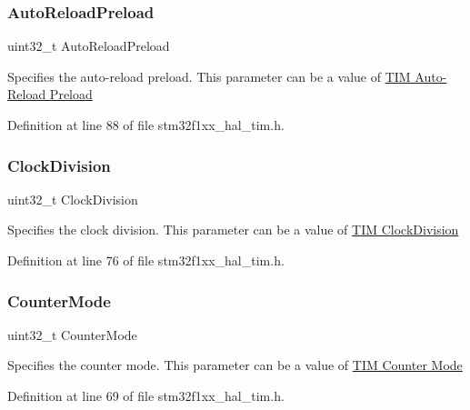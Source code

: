 \subsubsection{\texorpdfstring{Auto\+Reload\+Preload}{AutoReloadPreload}}
{\footnotesize\ttfamily uint32\+\_\+t Auto\+Reload\+Preload}

Specifies the auto-\/reload preload. This parameter can be a value of \hyperlink{group___t_i_m___auto_reload_preload}{T\+IM Auto-\/\+Reload Preload} 

Definition at line 88 of file stm32f1xx\+\_\+hal\+\_\+tim.\+h.

\mbox{\label{struct_t_i_m___base___init_type_def_a8f20e02ae2774e1523942604315b8e13}} 
\subsubsection{\texorpdfstring{Clock\+Division}{ClockDivision}}
{\footnotesize\ttfamily uint32\+\_\+t Clock\+Division}

Specifies the clock division. This parameter can be a value of \hyperlink{group___t_i_m___clock_division}{T\+IM Clock\+Division} 

Definition at line 76 of file stm32f1xx\+\_\+hal\+\_\+tim.\+h.

\mbox{\label{struct_t_i_m___base___init_type_def_a4b29303489c983d0e9326d7ae0196ceb}} 
\subsubsection{\texorpdfstring{Counter\+Mode}{CounterMode}}
{\footnotesize\ttfamily uint32\+\_\+t Counter\+Mode}

Specifies the counter mode. This parameter can be a value of \hyperlink{group___t_i_m___counter___mode}{T\+IM Counter Mode} 

Definition at line 69 of file stm32f1xx\+\_\+hal\+\_\+tim.\+h.

